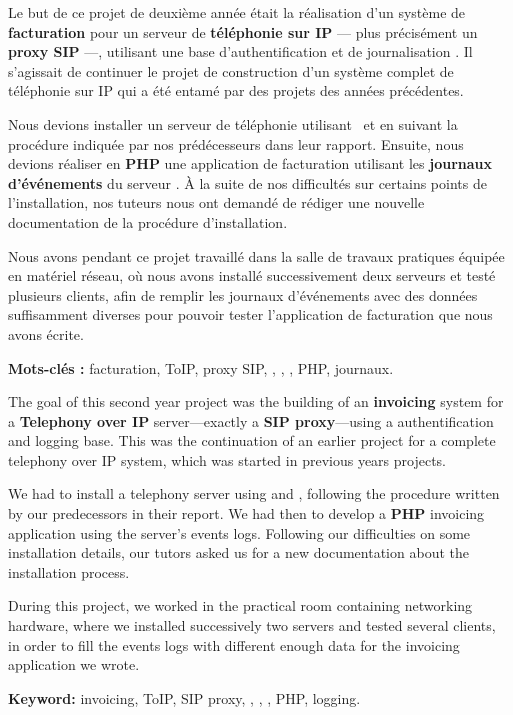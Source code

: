 

Le but de ce projet de deuxième année était la réalisation d’un système de \textbf{facturation} pour un serveur de \textbf{téléphonie sur IP} — plus précisément un \textbf{proxy SIP} —, \textbf{\kam} utilisant une base d’authentification et de journalisation \textbf{\rad}. Il s’agissait de continuer le projet de construction d’un système complet de téléphonie sur IP qui a été entamé par des projets des années précédentes.

Nous devions installer un serveur de téléphonie utilisant \kam~et \textbf{\frad} en suivant la procédure indiquée par nos prédécesseurs dans leur rapport. Ensuite, nous devions réaliser en \textbf{PHP} une application de facturation utilisant les \textbf{journaux d’événements} du serveur \rad. À la suite de nos difficultés sur certains points de l’installation, nos tuteurs nous ont demandé de rédiger une nouvelle documentation de la procédure d’installation.

Nous avons pendant ce projet travaillé dans la salle de travaux pratiques équipée en matériel réseau, où nous avons installé successivement deux serveurs et testé plusieurs clients, afin de remplir les journaux d’événements avec des données suffisamment diverses pour pouvoir tester l’application de facturation que nous avons écrite.

\begin{itshape}
\noindent\textbf{Mots-clés :} facturation, ToIP, proxy SIP, \kam, \rad, \frad, PHP, journaux.
\end{itshape}


The goal of this second year project was the building of an \textbf{invoicing} system for a \textbf{Telephony over IP} server—exactly a \textbf{SIP proxy}—using a \textbf{\rad} authentification and logging base. This was the continuation of an earlier project for a complete telephony over IP system, which was started in previous years projects.

We had to install a telephony server using {\kam} and \textbf{\frad}, following the procedure written by our predecessors in their report. We had then to develop a \textbf{PHP} invoicing application using the {\rad} server’s events logs. Following our difficulties on some installation details, our tutors asked us for a new documentation about the installation process.

During this project, we worked in the practical room containing networking hardware, where we installed successively two servers and tested several clients, in order to fill the events logs with different enough data for the invoicing application we wrote.

\begin{itshape}
\noindent\textbf{Keyword:} invoicing, ToIP, SIP proxy, \kam, \rad, \frad, PHP, logging.
\end{itshape}

\restoregeometry
